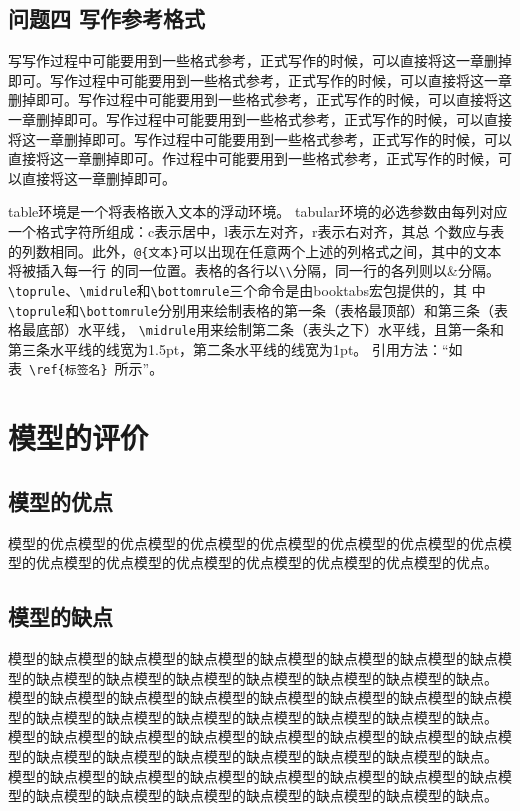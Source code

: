 \documentclass{cumcmthesis}
\begin{document}
	\subsection{问题四 写作参考格式}

	写写作过程中可能要用到一些格式参考，正式写作的时候，可以直接将这一章删掉即可。写作过程中可能要用到一些格式参考，正式写作的时候，可以直接将这一章删掉即可。写作过程中可能要用到一些格式参考，正式写作的时候，可以直接将这一章删掉即可。写作过程中可能要用到一些格式参考，正式写作的时候，可以直接将这一章删掉即可。写作过程中可能要用到一些格式参考，正式写作的时候，可以直接将这一章删掉即可。作过程中可能要用到一些格式参考，正式写作的时候，可以直接将这一章删掉即可。

	\bigskip
	table环境是一个将表格嵌入文本的浮动环境。
	tabular环境的必选参数由每列对应一个格式字符所组成：c表示居中，l表示左对齐，r表示右对齐，其总
	个数应与表的列数相同。此外，\verb|@{文本}|可以出现在任意两个上述的列格式之间，其中的文本将被插入每一行
	的同一位置。表格的各行以\verb|\\|分隔，同一行的各列则以\&分隔。
	\verb|\toprule|、\verb|\midrule|和\verb|\bottomrule|三个命令是由booktabs宏包提供的，其
	中\verb|\toprule|和\verb|\bottomrule|分别用来绘制表格的第一条（表格最顶部）和第三条（表格最底部）水平线，
	\verb|\midrule|用来绘制第二条（表头之下）水平线，且第一条和第三条水平线的线宽为1.5pt，第二条水平线的线宽为1pt。
	引用方法：“如表~\verb|\ref{标签名}|~所示”。

	\section{模型的评价}
	\subsection{模型的优点}
	模型的优点模型的优点模型的优点模型的优点模型的优点模型的优点模型的优点模型的优点模型的优点模型的优点模型的优点模型的优点模型的优点模型的优点。
	\subsection{模型的缺点}
	模型的缺点模型的缺点模型的缺点模型的缺点模型的缺点模型的缺点模型的缺点模型的缺点模型的缺点模型的缺点模型的缺点模型的缺点模型的缺点模型的缺点。 
	模型的缺点模型的缺点模型的缺点模型的缺点模型的缺点模型的缺点模型的缺点模型的缺点模型的缺点模型的缺点模型的缺点模型的缺点模型的缺点模型的缺点。 
	模型的缺点模型的缺点模型的缺点模型的缺点模型的缺点模型的缺点模型的缺点模型的缺点模型的缺点模型的缺点模型的缺点模型的缺点模型的缺点模型的缺点。 
	模型的缺点模型的缺点模型的缺点模型的缺点模型的缺点模型的缺点模型的缺点模型的缺点模型的缺点模型的缺点模型的缺点模型的缺点模型的缺点模型的缺点。 
	
\end{document}
